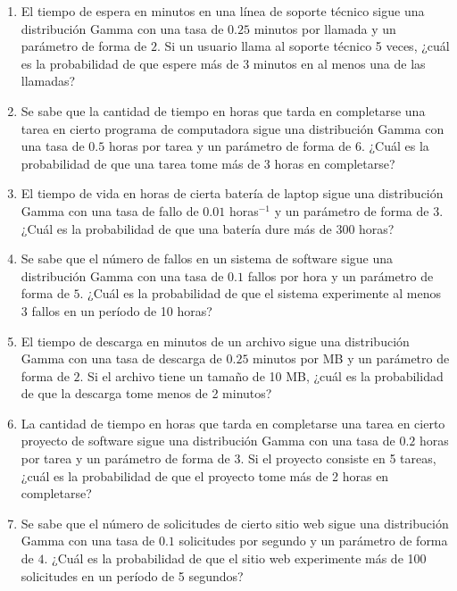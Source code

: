\begin{Ejer}
\begin{enumerate}
\item El tiempo de espera en minutos en una línea de soporte técnico sigue una distribución Gamma con una tasa de $0.25$ minutos por llamada y un parámetro de forma de $2$. Si un usuario llama al soporte técnico 5 veces, ¿cuál es la probabilidad de que espere más de 3 minutos en al menos una de las llamadas?

\item Se sabe que la cantidad de tiempo en horas que tarda en completarse una tarea en cierto programa de computadora sigue una distribución Gamma con una tasa de $0.5$ horas por tarea y un parámetro de forma de $6$. ¿Cuál es la probabilidad de que una tarea tome más de 3 horas en completarse?

\item El tiempo de vida en horas de cierta batería de laptop sigue una distribución Gamma con una tasa de fallo de $0.01$ horas$^{-1}$ y un parámetro de forma de $3$. ¿Cuál es la probabilidad de que una batería dure más de 300 horas?

\item Se sabe que el número de fallos en un sistema de software sigue una distribución Gamma con una tasa de $0.1$ fallos por hora y un parámetro de forma de $5$. ¿Cuál es la probabilidad de que el sistema experimente al menos 3 fallos en un período de 10 horas?

\item El tiempo de descarga en minutos de un archivo sigue una distribución Gamma con una tasa de descarga de $0.25$ minutos por MB y un parámetro de forma de $2$. Si el archivo tiene un tamaño de 10 MB, ¿cuál es la probabilidad de que la descarga tome menos de 2 minutos?

\item La cantidad de tiempo en horas que tarda en completarse una tarea en cierto proyecto de software sigue una distribución Gamma con una tasa de $0.2$ horas por tarea y un parámetro de forma de $3$. Si el proyecto consiste en 5 tareas, ¿cuál es la probabilidad de que el proyecto tome más de 2 horas en completarse?

\item Se sabe que el número de solicitudes de cierto sitio web sigue una distribución Gamma con una tasa de $0.1$ solicitudes por segundo y un parámetro de forma de $4$. ¿Cuál es la probabilidad de que el sitio web experimente más de 100 solicitudes en un período de 5 segundos?


\end{enumerate}
\end{Ejer} 


